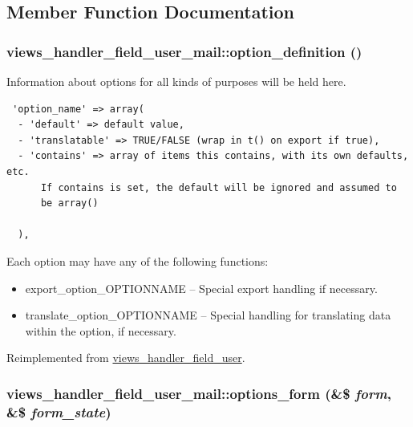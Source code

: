 \subsection{Member Function Documentation}
\hypertarget{classviews__handler__field__user__mail_747c64da5c9bdbd55c7a8908779db5a1}{
\subsubsection[{option\_\-definition}]{\setlength{\rightskip}{0pt plus 5cm}views\_\-handler\_\-field\_\-user\_\-mail::option\_\-definition ()}}
\label{classviews__handler__field__user__mail_747c64da5c9bdbd55c7a8908779db5a1}


Information about options for all kinds of purposes will be held here. 

\begin{Code}\begin{verbatim} 'option_name' => array(
  - 'default' => default value,
  - 'translatable' => TRUE/FALSE (wrap in t() on export if true),
  - 'contains' => array of items this contains, with its own defaults, etc.
      If contains is set, the default will be ignored and assumed to
      be array()

  ),
\end{verbatim}
\end{Code}

 Each option may have any of the following functions:\begin{itemize}
\item export\_\-option\_\-OPTIONNAME -- Special export handling if necessary.\item translate\_\-option\_\-OPTIONNAME -- Special handling for translating data within the option, if necessary. \end{itemize}


Reimplemented from \hyperlink{classviews__handler__field__user_545d229a041bf920b95ac59d89b1e4b2}{views\_\-handler\_\-field\_\-user}.\hypertarget{classviews__handler__field__user__mail_ee55735f96178173853dbf1f8b293216}{
\subsubsection[{options\_\-form}]{\setlength{\rightskip}{0pt plus 5cm}views\_\-handler\_\-field\_\-user\_\-mail::options\_\-form (\&\$ {\em form}, \/  \&\$ {\em form\_\-state})}}
\label{classviews__handler__field__user__mail_ee55735f96178173853dbf1f8b293216}


